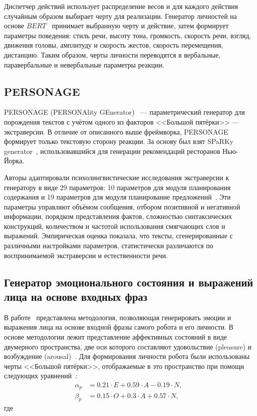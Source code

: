 
Диспетчер действий использует распределение весов и для каждого действия случайным образом выбирает черту для реализации.
Генератор личностей на основе $BERT$~\cite{devlin2019bert} принимает выбранную черту и действие, затем формирует параметры поведения: стиль речи, высоту тона, громкость, скорость речи, взгляд, движения головы, амплитуду и скорость жестов, скорость перемещения, дистанцию.
Таким образом, черты личности переводятся в вербальные, паравербальные и невербальные параметры реакции.

\subsection{PERSONAGE}

PERSONAGE (PERSONAlity GEnerator)~\cite{Mairesse2007Personage} --- параметрический генератор для порождения текстов с учётом одного из факторов <<Большой пятёрки>> --- экстраверсии.
В отличие от описанного выше фреймворка, PERSONAGE формирует только текстовую сторону реакции.
За основу был взят SPaRKy generator~\cite{Walker2002SPaRKy}, использовавшийся для генерации рекомендаций ресторанов Нью-Йорка.

Авторы адаптировали психолингвистические исследования экстраверсии к генератору в виде 29 параметров: 10 параметров для модуля планирования содержания и 19 параметров для модуля планирование предложений~\cite{Mairesse2007Personage}.
Эти параметры управляют объёмом сообщения, отбором позитивной и негативной информации, порядком представления фактов, сложностью синтаксических конструкций, количеством и частотой использования смягчающих слов и выражений.
Эмпирическая оценка показала, что тексты, сгенерированные с различными настройками параметров, статистически различаются по воспринимаемой экстраверсии и естественности речи.

\subsection{Генератор эмоционального состояния и выражений лица на основе входных фраз}

В работе~\cite{Chae2025AffectiveState} представлена методология, позволяющая генерировать эмоции и выражения лица на основе входной фразы самого робота и его личности.
В основе методологии лежит представление аффективных состояний в виде двумерного пространства, две оси которого составляют удовольствие (pleasure) и возбуждение (arousal)~\cite{russell1980circumplex}.
Для формирования личности робота были использованы черты <<Большой пятёрки>>, отображаемые в это пространство при помощи следующих уравнений~\cite{mehrabian1996pad}:
\begin{align}
	\alpha_p &= 0.21 \cdot E + 0.59 \cdot A - 0.19 \cdot N,\\
	\beta_p  &= 0.15 \cdot O + 0.3 \cdot A + 0.57 \cdot N,
\end{align}
где


